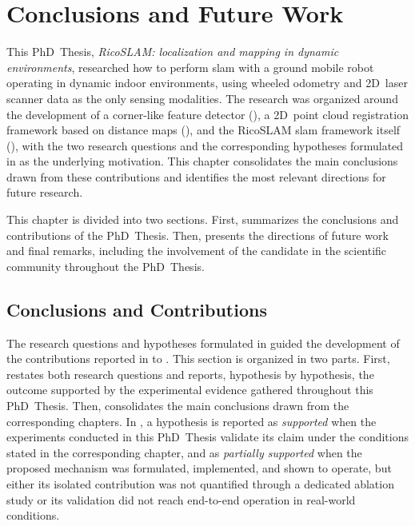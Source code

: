 \chapter{Conclusions and Future Work}\label{chap:conclusions}

This PhD~Thesis, \emph{RicoSLAM: localization and mapping in dynamic
environments}, researched how to perform \gls{slam} with a ground mobile
robot operating in dynamic indoor environments, using wheeled odometry and
2D~laser scanner data as the only sensing modalities. The research was
organized around the development of a corner-like feature detector
(), a 2D~point cloud registration framework
based on distance maps (), and the
RicoSLAM \gls{slam} framework itself (), with the
two research questions and the corresponding hypotheses formulated in
 as the underlying motivation.
This chapter consolidates the main conclusions drawn from
these contributions and identifies the most relevant directions
for future research.

This chapter is divided into two sections.
First,  summarizes the
conclusions and contributions of the PhD~Thesis.
Then,  presents the directions of future
work and final remarks, including the involvement of
the candidate in the scientific community throughout the PhD~Thesis.

\section{Conclusions and Contributions}\label{sec:conclusions:contributions}

The research questions and hypotheses formulated in
 guided the development of the contributions
reported in  to .
This section is organized in two parts.
First,  restates both research questions and
reports, hypothesis by hypothesis, the outcome supported by the
experimental evidence gathered throughout this PhD~Thesis.
Then,  consolidates the main conclusions
drawn from the corresponding chapters.
In , a hypothesis is reported as
\emph{supported} when the experiments conducted in this PhD~Thesis validate
its claim under the conditions stated in the corresponding chapter, and as
\emph{partially supported} when the proposed mechanism was formulated,
implemented, and shown to operate, but either its isolated contribution was
not quantified through a dedicated ablation study or its validation did not
reach end-to-end operation in real-world conditions.

